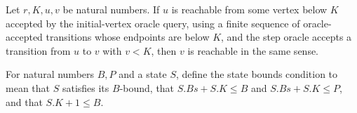 \begin{lemma}
\label{Complexity.LogProg.ExpBFS.Cl.step}
\leanok
{}
Let $r,K,u,v$ be natural numbers. If $u$ is reachable from some vertex below $K$
accepted by the initial-vertex oracle query, using a finite sequence of oracle-accepted
transitions whose endpoints are below $K$, and the step oracle accepts a transition from
$u$ to $v$ with $v<K$, then $v$ is reachable in the same sense.
\end{lemma}

\begin{definition}
\label{Complexity.LogProg.ExpBFS.SBd}
\leanok
{}
For natural numbers $B,P$ and a state $S$, define the state bounds condition to mean
that $S$ satisfies its $B$-bound, that $S.Bs+S.K\le B$ and $S.Bs+S.K\le P$, and that
$S.K+1\le B$.
\end{definition}

